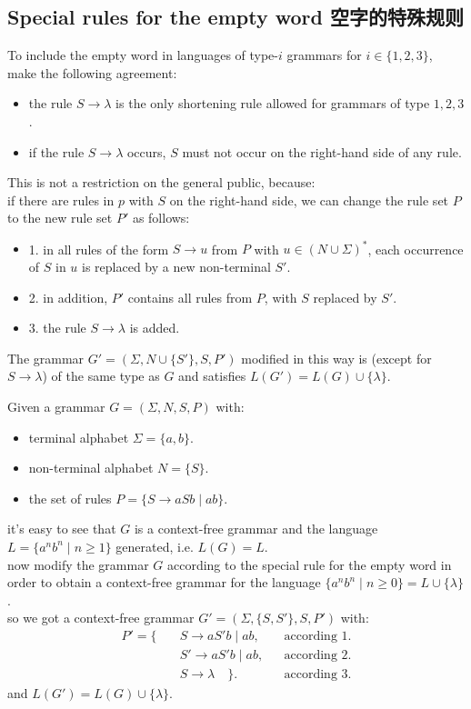 \documentclass[a4paper,11pt,utf8]{article}
\newcommand{\newindent}{\\ \hspace*{\parindent}}
\newcommand{\lineindent}{\hspace*{\parindent}}
\begin{document}
\subsection{Special rules for the empty word 空字的特殊规则}
To include the empty word in languages of type-$i$ grammars for $i \in \{1,2,3\}$, make the following agreement:
\begin{itemize}
    \item the rule $S \to \lambda$ is the only shortening rule allowed for grammars of type $1,2,3$.
    \item if the rule $S \to \lambda$ occurs, $S$ must not occur on the right-hand side of any rule.
\end{itemize}
\lineindent This is not a restriction on the general public, because: \\ \lineindent
if there are rules in $p$ with $S$ on the right-hand side, we can change the rule set $P$ to the new rule set $P'$ as follows:
\begin{itemize}
    \item 1. in all rules of the form $S \to u$ from $P$ with $u \in (N \cup \Sigma)^*$, each occurrence of $S$ in $u$ is replaced by a new non-terminal $S'$.
    \item 2. in addition, $P'$ contains all rules from $P$, with $S$ replaced by $S'$.
    \item 3. the rule $S \to \lambda$ is added.
\end{itemize}
\lineindent The grammar $G' = (\Sigma, N \cup \{S'\}, S, P')$ modified in this way is (except for $S \to \lambda$) of the same type as $G$ and satisfies $L(G') = L(G) \cup \{\lambda\}$.
\begin{tcolorbox}[title=example,colback=white,colframe=black,width=\textwidth,arc=0pt]
    Given a grammar $G = (\Sigma, N, S, P)$ with:
    \begin{itemize}
        \item terminal alphabet $\Sigma = \{a,b\}$.
        \item non-terminal alphabet $N = \{S\}$.
        \item the set of rules $P = \{S \to aSb \mid ab\}$.
    \end{itemize}
    it's easy to see that $G$ is a context-free grammar and the language $L = \{a^nb^n \mid n \geq 1\}$ generated, i.e. $L(G) = L$. \newindent
    now modify the grammar $G$ according to the special rule for the empty word in order to obtain a context-free grammar for the language $\{a^nb^n \mid n \geq 0\} = L \cup \{\lambda\}$. \newindent
    so we got a context-free grammar $G' = (\Sigma, \{S,S'\}, S, P')$ with:
    \[
        \begin{aligned}
            P' = \{ \quad &S \to a S' b \mid ab, &&\text{according 1.}\\[1ex]
            &S' \to a S' b \mid ab, &&\text{according 2.}\\[1ex]
            &S \to \lambda \quad\}. &&\text{according 3.}
        \end{aligned}
    \]
    \lineindent and $L(G') = L(G) \cup \{\lambda\}$.
\end{tcolorbox}










% 
\end{document}
